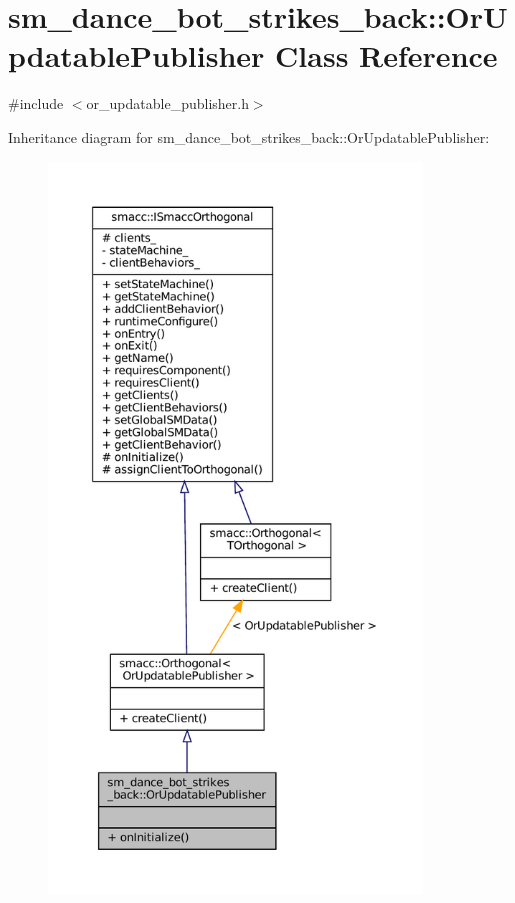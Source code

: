 \hypertarget{classsm__dance__bot__strikes__back_1_1OrUpdatablePublisher}{}\section{sm\+\_\+dance\+\_\+bot\+\_\+strikes\+\_\+back\+:\+:Or\+Updatable\+Publisher Class Reference}
\label{classsm__dance__bot__strikes__back_1_1OrUpdatablePublisher}


{\ttfamily \#include $<$or\+\_\+updatable\+\_\+publisher.\+h$>$}



Inheritance diagram for sm\+\_\+dance\+\_\+bot\+\_\+strikes\+\_\+back\+:\+:Or\+Updatable\+Publisher\+:
\nopagebreak
\begin{figure}[H]
\begin{center}
\leavevmode
\includegraphics[height=550pt]{classsm__dance__bot__strikes__back_1_1OrUpdatablePublisher__inherit__graph}
\end{center}
\end{figure}


